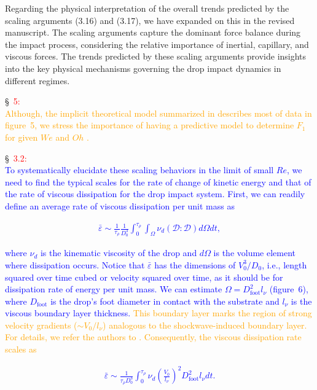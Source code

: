 \documentclass[]{article}
\newcommand*\blue{\textcolor{blue}}
\newcommand*\red{\textcolor{red}}
\newcommand{\VS}[1]{{\textcolor{orange}{#1}}}
\begin{document}
\begin{enumerate}
	Regarding the physical interpretation of the overall trends predicted by the scaling arguments (3.16) and (3.17), we have expanded on this in the revised manuscript. The scaling arguments capture the dominant force balance during the impact process, considering the relative importance of inertial, capillary, and viscous forces. The trends predicted by these scaling arguments provide insights into the key physical mechanisms governing the drop impact dynamics in different regimes.
	
	\S~\red{5:}\\
	\VS{Although, the implicit theoretical model summarized in \citet{cheng2021drop} describes most of data in figure~5, we stress the importance of having a predictive model to determine $F_1$ for given $We$ and $Oh$ \citep{sanjay2024PRL}.} 
	
	\S~\red{3.2:}\\
	\blue{To systematically elucidate these scaling behaviors in the limit of small $Re$, we need to find the typical scales for the rate of change of kinetic energy and that of the rate of viscous dissipation for the drop impact system. First, we can readily define an average rate of viscous dissipation per unit mass as}
	
	\blue{\begin{align}
		\bar{\varepsilon} \sim \frac{1}{\tau_\rho}\frac{1}{D_0^3}\int_0^{\tau_\rho}\int_\Omega\nu_d\left(\boldsymbol{\mathcal{D}:\mathcal{D}}\right)d\Omega dt,
	\end{align}}
	
	\noindent \blue{where $\nu_d$ is the kinematic viscosity of the drop and $d\Omega$ is the volume element where dissipation occurs. Notice that $\bar{\varepsilon}$ has the dimensions of $V_0^3/D_0$, i.e., length squared over time cubed or velocity squared over time, as it should be for dissipation rate of energy per unit mass. We can estimate $\Omega = D_{\text{foot}}^2l_\nu$ (figure~6), where $D_{\text{foot}}$ is the drop's foot diameter in contact with the substrate and $l_\nu$ is the viscous boundary layer thickness.} \VS{This boundary layer marks the region of strong velocity gradients ($\sim V_0/l_\nu$) analogous to the \citet{mirels1955laminar} shockwave-induced boundary layer. For details, we refer the authors to \citet{schlichting2016boundary, Schroll2010, Philippi2016}. Consequently, the viscous dissipation rate scales as}
	
	\blue{\begin{align}\label{eq:dissipationScale}
		\bar{\varepsilon} \sim \frac{1}{\tau_\rho D_0^3}\int_0^{\tau_\rho}\nu_d \left(\frac{V_0}{l_\nu}\right)^2 D_{\text{foot}}^2l_\nu dt.
	\end{align}}
	

\end{enumerate}
\end{document}
